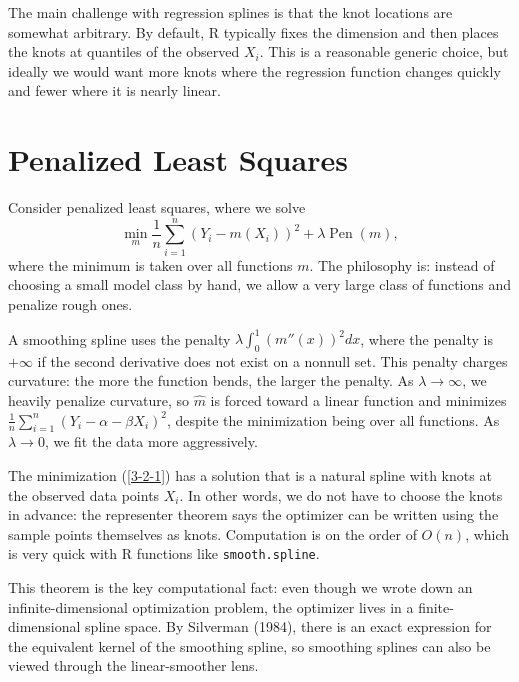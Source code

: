 The main challenge with regression splines is that the knot locations are somewhat arbitrary. By default, R typically fixes the dimension and then places the knots at quantiles of the observed $X_i$. This is a reasonable generic choice, but ideally we would want more knots where the regression function changes quickly and fewer where it is nearly linear.

\section{Penalized Least Squares}

Consider penalized least squares, where we solve \begin{equation} \label{3-2-1}
	\min_{m} \frac{1}{n} \sum\limits_{i=1}^{n} \left( Y_i - m(X_i) \right)^2 + \lambda \operatorname{Pen}(m)
,\end{equation} where the minimum is taken over all functions $m$. 
The philosophy is: instead of choosing a small model class by hand, we allow a very large class of functions and penalize rough ones.

A smoothing spline uses the penalty $\lambda \int_{0}^{1} \left( m''(x) \right)^2 dx $, where the penalty is $+\infty$ if the second derivative does not exist on a nonnull set. This penalty charges curvature: the more the function bends, the larger the penalty. As $\lambda \to \infty$, we heavily penalize curvature, so $\hat{m}$ is forced toward a linear function and minimizes $\frac{1}{n} \sum_{i=1}^{n} \left( Y_i - \alpha - \beta X_i \right)^2$, despite the minimization being over all functions. As $\lambda \to 0$, we fit the data more aggressively.

\begin{theorem}[Representer]
	The minimization (\ref{3-2-1}) has a solution that is a natural spline with knots at the observed data points $X_i$. In other words, we do not have to choose the knots in advance: the representer theorem says the optimizer can be written using the sample points themselves as knots.
	Computation is on the order of $O(n)$, which is very quick with R functions like \texttt{smooth.spline}.
\end{theorem}
This theorem is the key computational fact: even though we wrote down an infinite-dimensional optimization problem, the optimizer lives in a finite-dimensional spline space. By Silverman (1984), there is an exact expression for the equivalent kernel of the smoothing spline, so smoothing splines can also be viewed through the linear-smoother lens.

